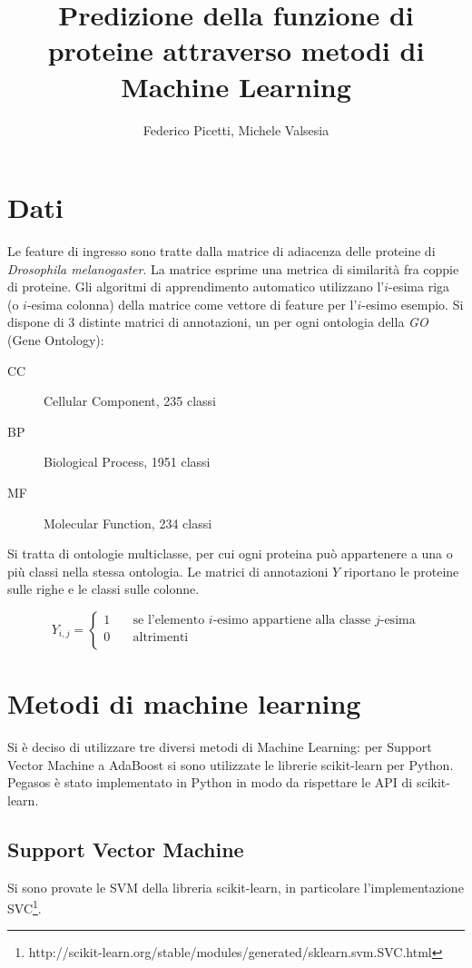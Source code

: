 \documentclass[11pt,a4paper]{report}
\author{Federico Picetti, Michele Valsesia}
\title{Predizione della funzione di proteine attraverso metodi di Machine Learning}
\begin{document}
\tableofcontents

\chapter{Dati}
Le feature di ingresso sono tratte dalla matrice di adiacenza delle proteine di \emph{Drosophila melanogaster}. La matrice esprime una metrica di similarità fra coppie di proteine.
Gli algoritmi di apprendimento automatico utilizzano l'$ i $-esima riga (o $ i $-esima colonna) della matrice come vettore di feature per l'$ i $-esimo esempio.
Si dispone di 3 distinte matrici di annotazioni, un per ogni ontologia della \emph{GO} (Gene Ontology):
\begin{description}
\item[CC]Cellular Component, 235 classi
\item[BP]Biological Process, 1951 classi
\item[MF]Molecular Function, 234 classi
\end{description}
Si tratta di ontologie multiclasse, per cui ogni proteina può appartenere a una o più classi nella stessa ontologia.
Le matrici di annotazioni $ Y $ riportano le proteine sulle righe e le classi sulle colonne. 

\[ Y_{i,j} =
  \begin{cases}
    1       & \quad \text{se l'elemento } i \text{-esimo appartiene alla classe } j \text{-esima}\\
    0  & \quad \text{altrimenti}\\
  \end{cases}
\]




\chapter{Metodi di machine learning}
Si è deciso di utilizzare tre diversi metodi di Machine Learning: per Support Vector Machine a AdaBoost si sono utilizzate le librerie scikit-learn per Python.
Pegasos è stato implementato in Python in modo da rispettare le API di scikit-learn.

\section{Support Vector Machine}
Si sono provate le SVM della libreria scikit-learn, in particolare l'implementazione SVC\footnote{http://scikit-learn.org/stable/modules/generated/sklearn.svm.SVC.html}.
\end{document}
